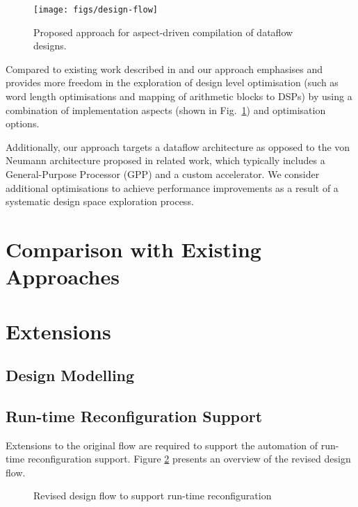 \begin{figure}[!h]
  \texttt{[image: figs/design-flow]}
  \caption{Proposed approach for aspect-driven compilation of dataflow
    designs.}
  \label{fig:design-flow}
\end{figure}

% 

Compared to existing work described in
\cite{Cardoso:Teixeira:Alves:Nobre:Diniz:Cutinho:Luk:2012} and
\cite{cardoso2011new} our approach emphasises and provides more
freedom in the exploration of design level optimisation (such as word
length optimisations and mapping of arithmetic blocks to DSPs) by
using a combination of implementation aspects (shown in
Fig.~\ref{fig:design-flow}) and \FAST{} optimisation options.

Additionally, our approach targets a dataflow architecture as opposed
to the von Neumann architecture proposed in related work, which
typically includes a General-Purpose Processor (GPP) and a custom
accelerator. We consider additional optimisations to achieve
performance improvements as a result of a systematic design space
exploration process.

\section{Comparison with Existing Approaches}

\section{Extensions}

\subsection{Design Modelling}

\subsection{Run-time Reconfiguration Support}

Extensions to the original flow are required to support the automation
of run-time reconfiguration support. Figure
\ref{fig:reconfig-design-flow} presents an overview of the revised
design flow.

\begin{figure}[!ht]
  \centering
  \def\svgwidth{\textwidth}
  
  \caption{Revised design flow to support run-time reconfiguration}
  \label{fig:reconfig-design-flow}
\end{figure}

